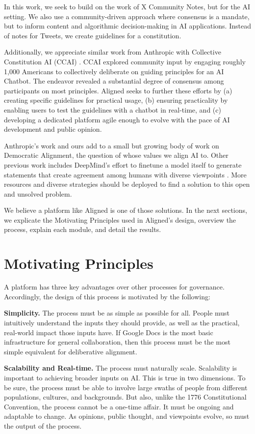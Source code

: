 \documentclass{article}
\begin{document}
\begin{multicols}{2}
In this work, we seek to build on the work of X Community Notes, but for the AI setting. We also use a community-driven approach where consensus is a mandate, but to inform content and algorithmic decision-making in AI applications. Instead of notes for Tweets, we create guidelines for a constitution.

Additionally, we appreciate similar work from Anthropic with Collective Constitution AI (CCAI) \cite{collectiveConst}. CCAI explored community input by engaging roughly 1,000 Americans to collectively deliberate on guiding principles for an AI Chatbot. The endeavor revealed a substantial degree of consensus among participants on most principles. Aligned seeks to further these efforts by (a) creating specific guidelines for practical usage, (b) ensuring practicality by enabling users to test the guidelines with a chatbot in real-time, and (c) developing a dedicated platform agile enough to evolve with the pace of AI development and public opinion.

Anthropic's work and ours add to a small but growing body of work on Democratic Alignment, the question of whose values we align AI to. Other previous work includes DeepMind's effort to finetune a model itself to generate statements that create agreement among humans with diverse viewpoints \cite{deepmind}. More resources and diverse strategies should be deployed to find a solution to this open and unsolved problem.

We believe a platform like Aligned is one of those solutions. In the next sections, we explicate the Motivating Principles used in Aligned's design, overview the process, explain each module, and detail the results.


\section{Motivating Principles}
A platform has three key advantages over other processes for governance. Accordingly, the design of this process is motivated by the following:

\textbf{Simplicity.}
The process must be as simple as possible for all. People must intuitively understand the inputs they should provide, as well as the practical, real-world impact those inputs have. If Google Docs is the most basic infrastructure for general collaboration, then this process must be the most simple equivalent for deliberative alignment.

\textbf{Scalability and Real-time.}
The process must naturally scale. Scalability is important to achieving broader inputs on AI. This is true in two dimensions. To be sure, the process must be able to involve large swaths of people from different populations, cultures, and backgrounds. But also, unlike the 1776 Constitutional Convention, the process cannot be a one-time affair. It must be ongoing and adaptable to change. As opinions, public thought, and viewpoints evolve, so must the output of the process.


\end{multicols}
\end{document}
